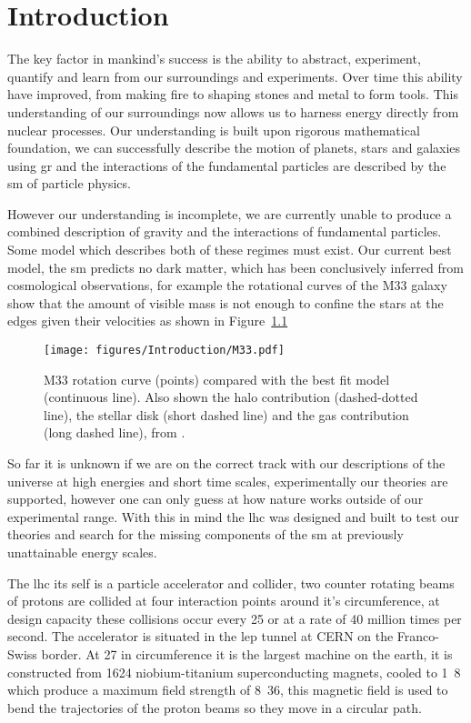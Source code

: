 \setcounter{page}{1}
\chapter{Introduction} %
\label{cha:introduction}
The key factor in mankind's success is the ability to abstract, experiment, 
quantify and learn from our surroundings and experiments. Over time this 
ability have improved, from making fire to shaping stones and metal to form 
tools. This understanding of our surroundings now allows us to harness energy 
directly from nuclear processes. Our understanding is built upon rigorous 
mathematical foundation, we can successfully describe the motion of planets, 
stars and galaxies using \ac{gr} and the interactions of the fundamental 
particles are described by the \ac{sm} of particle physics.

However our understanding is incomplete, we are currently unable to produce a 
combined description of gravity and the interactions of fundamental particles. 
Some model which describes both of these regimes must exist.
Our current best model, the \ac{sm} predicts no dark matter, which has been 
conclusively inferred from cosmological observations, for example the 
rotational curves of the M33 galaxy\cite{Corbelli1999af} show that the amount 
of visible mass is not enough to confine the stars at the edges given their 
velocities as shown in Figure~\ref{fig:M33RotationalCurve}
\begin{figure}
 \texttt{[image: figures/Introduction/M33.pdf]}
\caption{ M33 rotation curve (points) compared with the best fit model
(continuous line). Also shown  the 
halo contribution (dashed-dotted line), the stellar disk (short dashed 
line) and  the gas contribution (long dashed line), from 
\cite{Corbelli1999af}. }
\label{fig:M33RotationalCurve}
\end{figure}

So far it is unknown if we are on the correct track with our descriptions of 
the universe at high energies and short time scales, experimentally our 
theories are supported, however one can only guess at how nature works outside 
of our experimental range.
With this in mind the \ac{lhc} was designed and built to test our theories and 
search for the missing components of the \ac{sm} at previously unattainable 
energy scales.

The \ac{lhc} its self is a particle accelerator and collider, two counter 
rotating beams of protons are collided at four interaction points around it's 
circumference, at design capacity these collisions occur every 
\unit{25}{\nano\second} or at a rate of 40 million times per second.
The accelerator is situated in the \ac{lep} tunnel at CERN on the 
Franco-Swiss border. At \unit{27}{\kilo\meter} in circumference it is the 
largest machine on the earth, it is constructed from 1624 niobium-titanium 
superconducting magnets, cooled to \unit{1.8}{\kelvin} which produce a maximum 
field strength of \unit{8.36}{\tesla}, this magnetic field is used to bend the 
trajectories of the proton beams so they move in a circular path.

